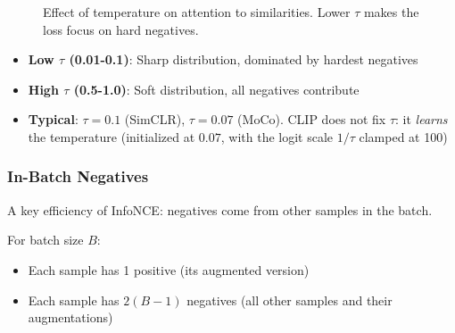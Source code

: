 \begin{figure}[H]
\centering
{}
\caption{Effect of temperature on attention to similarities. Lower $\tau$ makes the loss focus on hard negatives.}
\end{figure}

\begin{itemize}
    \item \textbf{Low $\tau$ (0.01-0.1)}: Sharp distribution, dominated by hardest negatives
    \item \textbf{High $\tau$ (0.5-1.0)}: Soft distribution, all negatives contribute
    \item \textbf{Typical}: $\tau = 0.1$ (SimCLR), $\tau = 0.07$ (MoCo). CLIP does not fix $\tau$: it \textit{learns} the temperature (initialized at $0.07$, with the logit scale $1/\tau$ clamped at 100)
\end{itemize}

\subsubsection{In-Batch Negatives}

A key efficiency of InfoNCE: negatives come from other samples in the batch.

For batch size $B$:
\begin{itemize}
    \item Each sample has 1 positive (its augmented version)
    \item Each sample has $2(B-1)$ negatives (all other samples and their augmentations)
\end{itemize}

